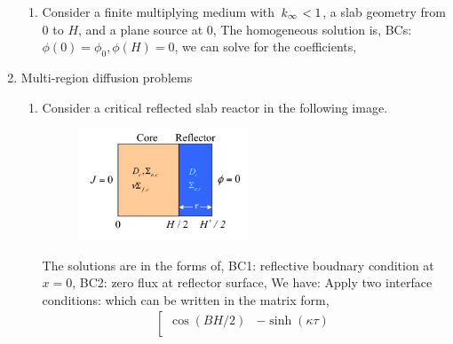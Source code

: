 \documentclass{school-22.211-notes}
\begin{document}
\begin{enumerate}
\begin{enumerate}
    \item Consider a finite multiplying medium with $\left. k_{\infty} \right. < 1$, a slab geometry from $0$ to $H$, and a plane source at $0$, 
      The homogeneous solution is, 
      BCs: $\phi(0) = \phi_0, \phi(H) = 0$, we can solve for the coefficients, 
  \end{enumerate}

\clearpage  
\item Multi-region diffusion problems
\begin{enumerate}
\item Consider a critical reflected slab reactor in the following image. 
  \begin{figure}[ht]
    \centering
    \includegraphics[width=2in]{images/dfs/reflected-slab.png}
  \end{figure}
  The solutions are in the forms of,
  BC1: reflective boudnary condition at $x=0$, BC2: zero flux at reflector surface, 
  We have: 
  Apply two interface conditions: 
  which can be written in the matrix form, 
  \begin{align}
    \left[ \begin{array}{cc}
        \cos (BH/2) & -\sinh(\kappa \tau) \\

\end{array}
\end{align}
\end{enumerate}
\end{enumerate}
\end{document}

